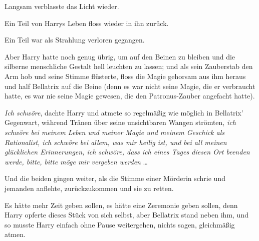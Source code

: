 Langsam verblasste das Licht wieder.

Ein Teil von Harrys Leben floss wieder in ihn zurück.

Ein Teil war als Strahlung verloren gegangen.

Aber Harry hatte noch genug übrig, um auf den Beinen zu bleiben und die silberne menschliche Gestalt hell leuchten zu lassen; und als sein Zauberstab den Arm hob und seine Stimme  flüsterte, floss die Magie gehorsam aus ihm heraus und half Bellatrix auf die Beine (denn es war nicht seine Magie, die er verbraucht hatte, es war nie seine Magie gewesen, die den Patronus-Zauber angefacht hatte).

\emph{Ich schwöre}, dachte Harry und atmete so regelmäßig wie möglich in Bellatrix’ Gegenwart, während Tränen über seine unsichtbaren Wangen strömten, \emph{ich schwöre bei meinem Leben und meiner Magie und meinem Geschick als Rationalist, ich schwöre bei allem, was mir heilig ist, und bei all meinen glücklichen Erinnerungen, ich schwöre, dass ich eines Tages diesen Ort beenden werde, bitte, bitte möge mir vergeben werden} …

Und die beiden gingen weiter, als die Stimme einer Mörderin schrie und jemanden anflehte, zurückzukommen und sie zu retten.

Es hätte mehr Zeit geben sollen, es hätte eine Zeremonie geben sollen, denn Harry opferte dieses Stück von sich selbst, aber Bellatrix stand neben ihm, und so musste Harry einfach ohne Pause weitergehen, nichts sagen, gleichmäßig atmen.

